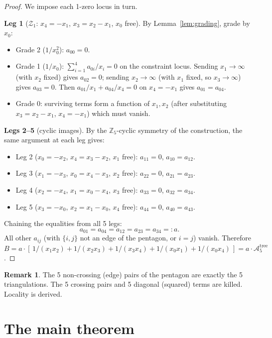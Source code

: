 \documentclass[11pt]{article}
\theoremstyle{plain}
\theoremstyle{definition}
\newtheorem{remark}[theorem]{Remark}
\newcommand{\Z}{\mathbb{Z}}
\newcommand{\cA}{\mathcal{A}}
\newcommand{\cZ}{\mathcal{Z}}
\begin{document}
\begin{proof}
We impose each 1-zero locus in turn.

\medskip\noindent\textbf{Leg 1} ($\cZ_1$: $x_4=-x_1$, $x_3=x_2-x_1$,
$x_0$ free). By Lemma~\ref{lem:grading}, grade by $x_0$:
\begin{itemize}[nosep]
\item Grade 2 ($1/x_0^2$): $a_{00}=0$.
\item Grade 1 ($1/x_0$): $\sum_{i=1}^4 a_{0i}/x_i = 0$ on the
      constraint locus. Sending $x_1\to\infty$ (with $x_2$ fixed)
      gives $a_{02}=0$; sending $x_2\to\infty$ (with $x_1$ fixed,
      so $x_3\to\infty$) gives $a_{03}=0$. Then
      $a_{01}/x_1 + a_{04}/x_4 = 0$ on $x_4=-x_1$ gives
      $a_{01}=a_{04}$.
\item Grade 0: surviving terms form a function of $x_1,x_2$
      (after substituting $x_3=x_2-x_1$, $x_4=-x_1$) which must
      vanish.
\end{itemize}

\noindent\textbf{Legs 2--5} (cyclic images). By the $\Z_5$-cyclic
symmetry of the construction, the same argument at each leg gives:
\begin{itemize}[nosep]
\item Leg 2 ($x_0=-x_2$, $x_4=x_3-x_2$, $x_1$ free):
      $a_{11}=0$, $a_{10}=a_{12}$.
\item Leg 3 ($x_1=-x_3$, $x_0=x_4-x_3$, $x_2$ free):
      $a_{22}=0$, $a_{21}=a_{23}$.
\item Leg 4 ($x_2=-x_4$, $x_1=x_0-x_4$, $x_3$ free):
      $a_{33}=0$, $a_{32}=a_{34}$.
\item Leg 5 ($x_3=-x_0$, $x_2=x_1-x_0$, $x_4$ free):
      $a_{44}=0$, $a_{40}=a_{43}$.
\end{itemize}
Chaining the equalities from all 5 legs:
\[
a_{01} = a_{04} = a_{12} = a_{23} = a_{34} =: a.
\]
All other $a_{ij}$ (with $\{i,j\}$ not an edge of the pentagon, or
$i=j$) vanish. Therefore
$B = a\cdot[\,1/(x_1 x_2) + 1/(x_2 x_3) + 1/(x_3 x_4) + 1/(x_0 x_1)
+ 1/(x_0 x_4)\,] = a\cdot\cA_5^{\mathrm{tree}}$.
\end{proof}

\begin{remark}
The 5 non-crossing (edge) pairs of the pentagon are exactly the
5 triangulations. The 5 crossing pairs and 5 diagonal (squared)
terms are killed. Locality is derived.
\end{remark}

\section{The main theorem}
\label{sec:main}
\end{document}
